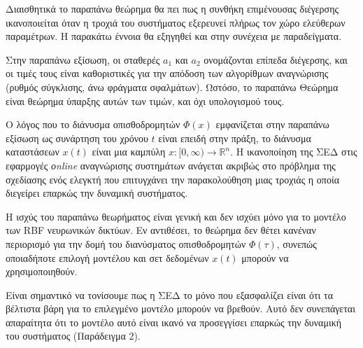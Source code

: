 Διαισθητικά το παραπάνω θεώρημα θα πει πως η συνθήκη επιμένουσας διέγερσης ικανοποιείται όταν η τροχιά του συστήματος εξερευνεί πλήρως τον χώρο ελεύθερων παραμέτρων. Η παρακάτω έννοια θα εξηγηθεί και στην συνέχεια με παραδείγματα.\\


\begin{remark}
	Στην παραπάνω εξίσωση, οι σταθερές $a_1$ και $a_2$ ονομάζονται επίπεδα διέγερσης, και οι τιμές τους είναι καθοριστικές για την απόδοση των αλγορίθμων αναγνώρισης (ρυθμός σύγκλισης, άνω φράγματα σφαλμάτων). Ωστόσο, το παραπάνω Θεώρημα είναι θεώρημα ύπαρξης αυτών των τιμών, και όχι υπολογισμού τους.\\
\end{remark}

\begin{remark}
	Ο λόγος που το διάνυσμα οπισθοδρομητών $\varPhi(x)$ εμφανίζεται στην παραπάνω εξίσωση ως συνάρτηση του χρόνου $t$ είναι επειδή στην πράξη, το διάνυσμα καταστάσεων $x(t)$ είναι μια καμπύλη $x: [0,\infty) \rightarrow \mathbb{R}^n$. Η ικανοποίηση της ΣΕΔ στις εφαρμογές \textit{οnline} αναγνώρισης συστημάτων ανάγεται ακριβώς στο πρόβλημα της σχεδίασης ενός ελεγκτή που επιτυγχάνει την παρακολούθηση μιας τροχιάς η οποία διεγείρει επαρκώς την δυναμική συστήματος.\\
\end{remark}

\begin{remark} 
	Η ισχύς του παραπάνω θεωρήματος είναι γενική και δεν ισχύει μόνο για το μοντέλο των RBF νευρωνικών δικτύων. Εν αντιθέσει, το θεώρημα δεν θέτει κανέναν περιορισμό για την δομή του διανύσματος οπισθοδρομητών $\varPhi(\tau)$, συνεπώς οποιαδήποτε επιλογή μοντέλου και σετ δεδομένων $x(t)$ μπορούν να χρησιμοποιηθούν.\\
\end{remark}

\begin{remark}
	Είναι σημαντικό να τονίσουμε πως η ΣΕΔ το μόνο που εξασφαλίζει είναι ότι τα βέλτιστα βάρη για το επιλεγμένο μοντέλο μπορούν να βρεθούν. Αυτό δεν συνεπάγεται απαραίτητα ότι το μοντέλο αυτό είναι ικανό να προσεγγίσει επαρκώς την δυναμική του συστήματος (Παράδειγμα 2).
\end{remark}

